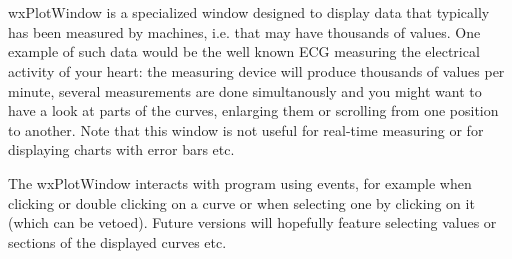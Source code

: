 %
%

\section{}\label{wxplotwindow}

wxPlotWindow is a specialized window designed to display data that typically has
been measured by machines, i.e. that may have thousands of values. One example of
such data would be the well known ECG measuring the electrical activity of your
heart: the measuring device will produce thousands of values per minute, several
measurements are done simultanously and you might want to have a look at parts
of the curves, enlarging them or scrolling from one position to another. Note
that this window is not useful for real-time measuring or for displaying charts
with error bars etc.

The wxPlotWindow interacts with program using events, for example when clicking
or double clicking on a curve or when selecting one by clicking on it (which
can be vetoed). Future versions will hopefully feature selecting values or
sections of the displayed curves etc.


\\
\\
\\
\\


\begin{twocollist}\itemsep=0pt
\end{twocollist}

